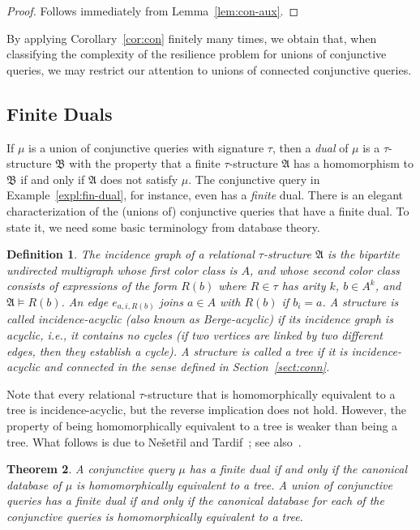 \documentclass[nonacm]{acmart}
\newcommand{\bA}{{\mathfrak A}}
\newcommand{\bB}{{\mathfrak B}}
\newtheorem{theorem}{Theorem}[section]
\newtheorem{definition}[theorem]{Definition}
\begin{document}
\begin{proof}
Follows immediately from Lemma~\ref{lem:con-aux}.
\end{proof}

By applying Corollary~\ref{cor:con} finitely many times, we obtain that, when classifying the complexity of the resilience problem for unions of conjunctive
queries, we may restrict our attention to unions of connected conjunctive queries.

\subsection{Finite Duals} \label{sect:fin-dual}
If $\mu$ is a union of conjunctive queries with signature $\tau$, then a \emph{dual} of $\mu$ is a $\tau$-structure $\bB$ with the property that a finite $\tau$-structure $\bA$ has a homomorphism to $\bB$ if and only if $\bA$ does not satisfy $\mu$. 
The conjunctive query in Example~\ref{expl:fin-dual}, for instance, even has a \emph{finite} dual. 
There is an elegant characterization of the (unions of) conjunctive queries that have a finite dual.
To state it, we need some basic terminology from database theory. 

\begin{definition}
The \emph{incidence graph} of a relational $\tau$-structure $\bA$ is the bipartite undirected multigraph whose first color class is $A$, and whose second color class consists of expressions of the form $R(b)$ where $R \in \tau$ has arity $k$, $b \in A^k$, 
and $\bA \models R(b)$.
An edge $e_{a,i,R(b)}$ joins $a \in A$ with $R(b)$ 
if $b_i = a$. 
A structure is called \emph{incidence-acyclic} (also known as Berge-acyclic) if its incidence graph is acyclic, i.e., it contains no cycles (if two vertices are linked by two different edges, then they establish a cycle).
A structure is called a \emph{tree} if it is incidence-acyclic and connected in the sense defined in Section~\ref{sect:conn}.
\end{definition}

Note that every relational $\tau$-structure that is homomorphically equivalent to a tree is incidence-acyclic, but the reverse implication does not hold. However, the property of being homomorphically equivalent to a tree is weaker than being a tree. 
What follows is due to Ne\v{s}et\v{r}il and Tardif~\cite{NesetrilTardif};  see also~\cite{Foniok-Thesis,LLT}. 

\begin{theorem}\label{thm:NT}
A conjunctive query $\mu$ has a finite dual if and only if 
the canonical database of 
$\mu$ is homomorphically equivalent to a tree.
A union of conjunctive queries has a finite dual if and only if the canonical database for each of the conjunctive queries is homomorphically equivalent to a tree. 
\end{theorem}
\end{document}
